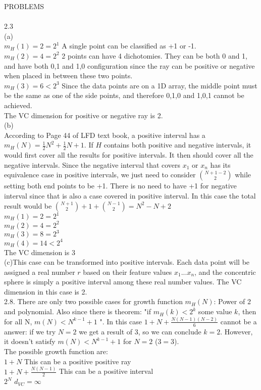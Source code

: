 \documentclass[12pt]{article}
\begin{document}
PROBLEMS\\\\
2.3\\
(a)\\
$m_H(1)=2=2^1$ 	A single point can be classified as +1 or -1.\\
$m_H(2)=4=2^2$	2 points can have 4 dichotomies. They can be both 0 and 1, and have both {0,1} and {1,0} configuration since the ray can be positive or negative when placed in between these two points. \\
$m_H(3)=6<2^3$ 	Since the data points are on a 1D array, the middle point must be the same as one of the side points, and therefore {0,1,0} and {1,0,1} cannot be achieved.\\
The VC dimension for positive or negative ray is 2.\\
(b)\\
According to Page 44 of LFD text book, a positive interval has a $m_H(N)=\frac{1}{2}N^2+\frac{1}{2}N+1$. If $H$ contains both positive and negative intervals, it would first cover all the results for positive intervals. It then should cover all the negative intervals. Since the negative interval that covers $x_1$ or $x_n$ has its equivalence case in positive intervals, we just need to consider ${N+1-2}\choose 2$ while setting both end points to be +1. There is no need to have +1 for negative interval since that is also a case covered in positive interval. In this case the total result would be ${{N+1}\choose 2} + 1 + {{N-1}\choose 2} = N^2-N+2$\\
$m_H(1)=2=2^1$\\
$m_H(2)=4=2^2$\\
$m_H(3)=8=2^3$\\
$m_H(4)=14<2^4$\\
The VC dimension is 3\\
(c)This case can be transformed into positive intervals. Each data point will be assigned a real number $r$ based on their feature values $x_1...x_n$, and the concentric sphere is simply a positive interval among these real number values. The VC dimension in this case is 2.\\

2.8. There are only two possible cases for growth function $m_H(N)$: Power of 2 and polynomial. Also since there is theorem: "if $m_H(k)<2^k$ some value $k$, then for all N, $m(N)<N^{k-1}+1$ ". In this case $1+N+\frac{N(N-1)(N-2)}{6}$ cannot be a answer: if we try $N=2$ we get a result of 3, so we can conclude $k=2$. However, it doesn't satisfy $m(N)<N^{k-1}+1$ for $N=2$ ($3=3$).\\
The possible growth function are:\\
$1+N$  This can be a positive positive ray\\
$1+N+\frac{N(N-1)}{2}$  This can be a positive interval\\
$2^N$  $d_{VC}=\infty$\\
\end{document}
